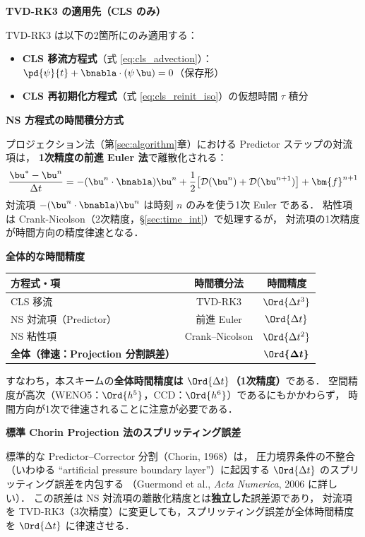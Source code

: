 \begin{tcolorbox}[warnbox, title={TVD-RK3 の適用範囲と全体時間精度}]
\label{warn:tvd_rk3_scope}
\textbf{TVD-RK3 の適用先（CLS のみ）}

TVD-RK3 は以下の2箇所にのみ適用する：
\begin{itemize}
  \item \textbf{CLS 移流方程式}（式 \eqref{eq:cls_advection}）：$\pd{\psi}{t} + \bnabla\cdot(\psi\,\bu) = 0$（保存形）
  \item \textbf{CLS 再初期化方程式}（式 \eqref{eq:cls_reinit_iso}）の仮想時間 $\tau$ 積分
\end{itemize}

\medskip
\noindent\textbf{NS 方程式の時間積分方式}

プロジェクション法（第\ref{sec:algorithm}章）における Predictor ステップの対流項は，
\textbf{1次精度の前進 Euler 法}で離散化される：
\[
  \frac{\bu^* - \bu^n}{\Delta t}
  = -(\bu^n \cdot \bnabla)\bu^n
    + \frac{1}{2}\bigl[\mathcal{D}(\bu^n) + \mathcal{D}(\bu^{n+1})\bigr]
    + \bm{f}^{n+1}
\]
対流項 $-(\bu^n\cdot\bnabla)\bu^n$ は時刻 $n$ のみを使う1次 Euler である．
粘性項は Crank-Nicolson（2次精度，§\ref{sec:time_int}）で処理するが，
対流項の1次精度が時間方向の精度律速となる．

\medskip
\noindent\textbf{全体的な時間精度}

\begin{center}
\renewcommand{\arraystretch}{1.25}
\begin{tabular}{lcc}
\hline
方程式・項 & 時間積分法 & 時間精度 \\
\hline
CLS 移流 & TVD-RK3 & $\Ord{\Delta t^3}$ \\
NS 対流項（Predictor） & 前進 Euler & $\Ord{\Delta t}$ \\
NS 粘性項 & Crank--Nicolson & $\Ord{\Delta t^2}$ \\
\hline
\textbf{全体（律速：Projection 分割誤差）} & & $\boldsymbol{\Ord{\Delta t}}$ \\
\hline
\end{tabular}
\end{center}

すなわち，本スキームの\textbf{全体時間精度は $\Ord{\Delta t}$（1次精度）}である．
空間精度が高次（WENO5：$\Ord{h^5}$，CCD：$\Ord{h^6}$）であるにもかかわらず，
時間方向が1次で律速されることに注意が必要である．

\medskip
\noindent\textbf{標準 Chorin Projection 法のスプリッティング誤差}

標準的な Predictor--Corrector 分割（Chorin, 1968）は，
圧力境界条件の不整合（いわゆる ``artificial pressure boundary layer''）に起因する
$\Ord{\Delta t}$ のスプリッティング誤差を内包する
（Guermond et al., \textit{Acta Numerica}, 2006 \cite{Guermond2006} に詳しい）．
この誤差は NS 対流項の離散化精度とは\textbf{独立した}誤差源であり，
対流項を TVD-RK3（3次精度）に変更しても，スプリッティング誤差が全体時間精度を $\Ord{\Delta t}$ に律速させる．


\end{tcolorbox}
